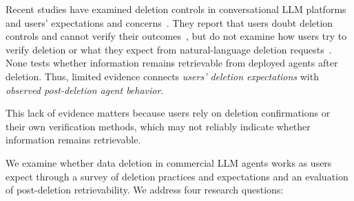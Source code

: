 %
Recent studies have examined deletion controls in conversational LLM platforms~\cite{li2026privacy} and users' expectations and concerns~\cite{malki2025hoovered,kwesi2026impact,chen2026relational}.
%
They report that users doubt deletion controls and cannot verify their outcomes~\cite{kwesi2026impact,chen2026relational}, but do not examine how users try to verify deletion or what they expect from natural-language deletion requests~\cite{li2026privacy}.
%
None tests whether information remains retrievable from deployed agents after deletion.
%
Thus, limited evidence connects \textit{users' deletion expectations} with \textit{observed post-deletion agent behavior}.

%
This lack of evidence matters because users rely on deletion confirmations or their own verification methods, which may not reliably indicate whether information remains retrievable.


We examine whether data deletion in commercial LLM agents works as users expect through a survey of deletion practices and expectations and an evaluation of post-deletion retrievability.
%
We address four research questions:


